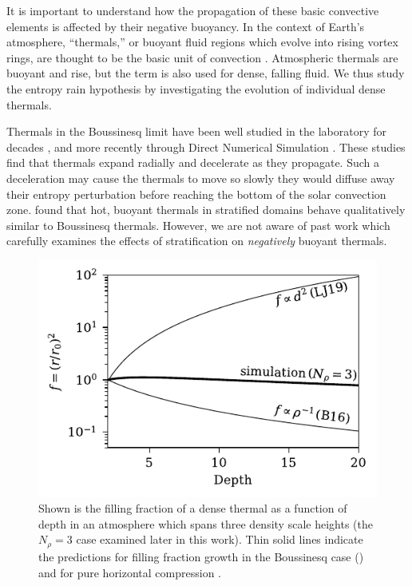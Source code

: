 It is important to understand how the propagation of these basic convective elements is affected by their negative buoyancy. 
In the context of Earth's atmosphere, ``thermals,'' or buoyant fluid regions which evolve into rising vortex rings, are thought to be the basic unit of convection \cite[e.g.,][]{romps&all2015}. 
Atmospheric thermals are buoyant and rise, but the term is also used for dense, falling fluid.
We thus study the entropy rain hypothesis by investigating the evolution of individual dense thermals.

Thermals in the Boussinesq limit have been well studied in the laboratory for decades \cite[see e.g.][]{morton&all1956, scorer1957}, and more recently through Direct Numerical Simulation \cite[DNS,][]{lecoanet&jeevanjee2018}. 
These studies find that thermals expand radially and decelerate as they propagate.
Such a deceleration may cause the thermals to move so slowly they would diffuse away their entropy perturbation before reaching the bottom of the solar convection zone.
\citet{brandenburg&hazlehurst2001} found that hot, buoyant thermals in stratified domains behave qualitatively similar to Boussinesq thermals.
However, we are not aware of past work which carefully examines the effects of stratification on \emph{negatively} buoyant thermals.


\begin{figure}[p!]
    \includegraphics[width=\columnwidth]{./figs/overview_fig.pdf}
    \caption[Filling factor evolution of entropy raindrops according to limiting theories and simulations.]
	{
	Shown is the filling fraction of a dense thermal as a function of depth in an atmosphere which spans three density scale heights (the $N_\rho = 3$ case examined later in this work). 
	Thin solid lines indicate the predictions for filling fraction growth in the Boussinesq case (\LJ) and for pure horizontal compression \cite[B16,][]{brandenburg2016}.
    \label{fig:overview} }
\end{figure}

